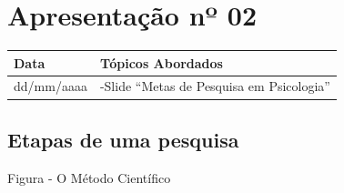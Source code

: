 \documentclass[
]{book}
\begin{document}
\hypertarget{apresentauxe7uxe3o-nuxba-02}{%
\section{Apresentação nº 02}\label{apresentauxe7uxe3o-nuxba-02}}

\begin{longtable}[]{@{}ll@{}}
\toprule()
Data & Tópicos Abordados \\
\midrule()
\endhead
dd/mm/aaaa & -Slide ``Metas de Pesquisa em Psicologia'' \\
\bottomrule()
\end{longtable}

\hypertarget{etapas-de-uma-pesquisa}{%
\subsection{Etapas de uma pesquisa}\label{etapas-de-uma-pesquisa}}

Figura - O Método Científico
\end{document}
